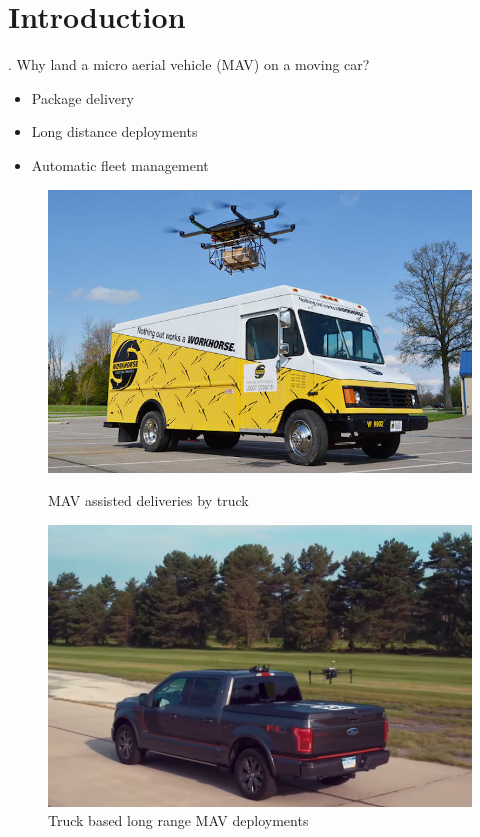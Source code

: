 \section{Introduction}

\begin{frame}{\thesection. \insertsection}
	Why land a micro aerial vehicle (MAV) on a moving car?
	\begin{itemize}
		\item Package delivery
		\item Long distance deployments
		\item Automatic fleet management
	\end{itemize}
	\begin{figure}[ht]
        \begin{minipage}[b]{0.45\linewidth}
            \centering
            \includegraphics[width=\textwidth]{figures/ups.jpg}
            \caption{MAV assisted deliveries by truck}
            \label{fig:a}
        \end{minipage}
        \hspace{0.5cm}
        \begin{minipage}[b]{0.45\linewidth}
            \centering
            \includegraphics[width=\textwidth]{figures/dji.png}
            \caption{Truck based long range MAV deployments}
            \label{fig:b}
        \end{minipage}
    \end{figure}
\end{frame}


